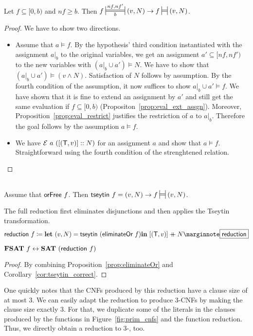 \begin{proposition}
  Let $f \subseteq [0, b)$ and $nf \ge b$. 
  Then $f \Frepr{nf}{nf'}{b} (v, N) \rightarrow f \frepr{} (v, N)$. 
\end{proposition}
\begin{proof}
  We have to show two directions. 
  \begin{itemize}
    \item Assume that $a \models f$. By the hypothesis' third condition instantiated with the assignment $a|_b$ to the original variables, we get an assignment $a' \subseteq [nf, nf')$ to the new variables with $(a|_b \cup a') \models N$. We have to show that $(a|_b \cup a') \models (v \land N)$. Satisfaction of $N$ follows by assumption. By the fourth condition of the assumption, it now suffices to show $a|_b \cup a' \models f$. We have shown that it is fine to extend an assignment by $a'$ and still get the same evaluation if $f \subseteq [0, b)$ (Propositon~\ref{prop:eval_ext_assgn}).
      Moreover, Proposition~\ref{prop:eval_restrict} justifies the restriction of $a$ to $a|_b$. Therefore the goal follows by the assumption $a \models f$.
    \item We have $\mathcal{E}~a~([(\mathsf{T}, v)] :: N)$ for an assignment $a$ and show that $a \models f$. Straightforward using the fourth condition of the strenghtened relation.
  \end{itemize}
\end{proof}

\begin{corollary}\label{cor:tseytin_correct}~\\
  Assume that $\textsf{orFree}~f$. Then $\tseytin~f = (v, N) \rightarrow f \frepr{} (v, N)$. 
\end{corollary}

The full reduction first eliminates disjunctions and then applies the Tseytin transformation.
\[\textsf{reduction}~f \defeq \llet (v, N) = \tseytin~(\eliminateOr~f) \lin [(\btrue, v)] \concat N \mnote{\textsf{reduction}}\]
\begin{lemma}
  $\textbf{FSAT}{}~f \leftrightarrow \textbf{SAT}{}~(\textsf{reduction}~f)$
\end{lemma}
\begin{proof}
  By combining Proposition~\ref{prop:eliminateOr} and Corollary~\ref{cor:tseytin_correct}.
\end{proof}

One quickly notes that the CNFs produced by this reduction have a clause size of at most 3. We can easily adapt the reduction to produce 3-CNFs by making the clause size exactly 3. For that, we duplicate some of the literals in the clauses produced by the functions in Figure~\ref{fig:prim_cnfs} and the function \textsf{reduction}.
Thus, we directly obtain a reduction to 3-\SAT{}, too.

